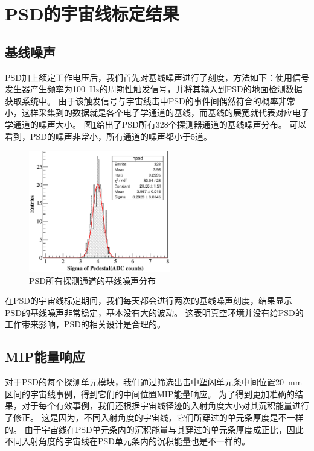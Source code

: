 \section{PSD的宇宙线标定结果}
\label{sec:cosmic_ray:results}
\subsection{基线噪声}
\label{sec:cosmic_ray:pedestal}
PSD加上额定工作电压后，我们首先对基线噪声进行了刻度，方法如下：使用信号发生器产生频率为\SI{100}{Hz}的周期性触发信号，并将其输入到PSD的地面检测数据获取系统中。
由于该触发信号与宇宙线击中PSD的事件间偶然符合的概率非常小，这样采集到的数据就是各个电子学通道的基线，而基线的展宽就代表对应电子学通道的噪声大小。
图\ref{fig:cosmic_ray:sigam_dist}给出了PSD所有328个探测器通道的基线噪声分布。
可以看到，PSD的噪声非常小，所有通道的噪声都小于5道。
\begin{figure}[htbp]
	\centering
	\includegraphics[width=0.55\textwidth]{chap/cosmic_ray/fig/sigam_dist.eps}
	\caption{PSD所有探测通道的基线噪声分布}
	\label{fig:cosmic_ray:sigam_dist}
\end{figure}

在PSD的宇宙线标定期间，我们每天都会进行两次的基线噪声刻度，结果显示PSD的基线噪声非常稳定，基本没有大的波动。
这表明真空环境并没有给PSD的工作带来影响，PSD的相关设计是合理的。

\subsection{MIP能量响应}
\label{sec:cosmic_ray:mip}
对于PSD的每个探测单元模块，我们通过筛选出击中塑闪单元条中间位置\SI{20}{mm}区间的宇宙线事例，得到它们的中间位置MIP能量响应。
为了得到更加准确的结果，对于每个有效事例，我们还根据宇宙线径迹的入射角度大小对其沉积能量进行了修正。
这是因为，不同入射角度的宇宙线，它们所穿过的单元条厚度是不一样的。
由于宇宙线在PSD单元条内的沉积能量与其穿过的单元条厚度成正比，因此不同入射角度的宇宙线在PSD单元条内的沉积能量也是不一样的。

